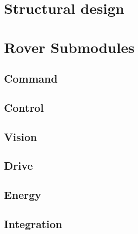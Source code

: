 \documentclass[11pt, a4paper]{article}
\begin{document}
\pagebreak

\section{Structural design}







\pagebreak



\pagebreak
\section{Rover Submodules}

\subsection{Command}



\subsection{Control}



\subsection{Vision}




\subsection{Drive}




\subsection{Energy}




\subsection{Integration}
\end{document}
